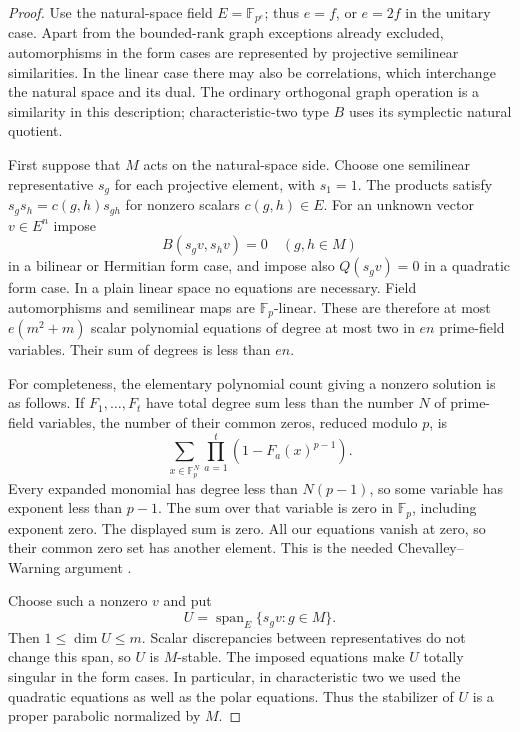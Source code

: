 \begin{proof}
Use the natural-space field $E=\mathbb F_{p^e}$; thus $e=f$, or $e=2f$
in the unitary case.  Apart from the bounded-rank graph exceptions
already excluded, automorphisms in the form cases are represented by
projective semilinear similarities.  In the linear case there may also
be correlations, which interchange the natural space and its dual.
The ordinary orthogonal graph operation is a similarity in this
description; characteristic-two type $B$ uses its symplectic natural
quotient.

First suppose that $M$ acts on the natural-space side.  Choose one
semilinear representative $s_g$ for each projective element, with
$s_1=1$.  The products satisfy
$s_gs_h=c(g,h)s_{gh}$ for nonzero scalars $c(g,h)\in E$.
For an unknown vector $v\in E^n$ impose
\[
 B(s_gv,s_hv)=0\quad(g,h\in M)
\]
in a bilinear or Hermitian form case, and impose also
$Q(s_gv)=0$ in a quadratic form case.  In a plain linear space no
equations are necessary.  Field automorphisms and semilinear maps are
$\mathbb F_p$-linear.  These are therefore at most $e(m^2+m)$ scalar
polynomial equations of degree at most two in $en$ prime-field
variables.  Their sum of degrees is less than $en$.

For completeness, the elementary polynomial count giving a nonzero
solution is as follows.  If $F_1,\ldots,F_t$ have total degree sum less
than the number $N$ of prime-field variables, the number of their common
zeros, reduced modulo $p$, is
\[
 \sum_{x\in\mathbb F_p^N}
       \prod_{a=1}^t(1-F_a(x)^{p-1}).
\]
Every expanded monomial has degree less than $N(p-1)$, so some variable
has exponent less than $p-1$.  The sum over that variable is zero in
$\mathbb F_p$, including exponent zero.  The displayed sum is zero.
All our equations vanish at zero, so their common zero set has another
element.  This is the needed Chevalley--Warning argument
\cite{Chevalley1935,Warning1935}.

Choose such a nonzero $v$ and put
\[
 U=\operatorname{span}_E\{s_gv:g\in M\}.
\]
Then $1\le\dim U\le m$.  Scalar discrepancies between representatives
do not change this span, so $U$ is $M$-stable.  The imposed equations
make $U$ totally singular in the form cases.  In particular, in
characteristic two we used the quadratic equations as well as the
polar equations.  Thus the stabilizer of $U$ is a proper parabolic
normalized by $M$.


\end{proof}
